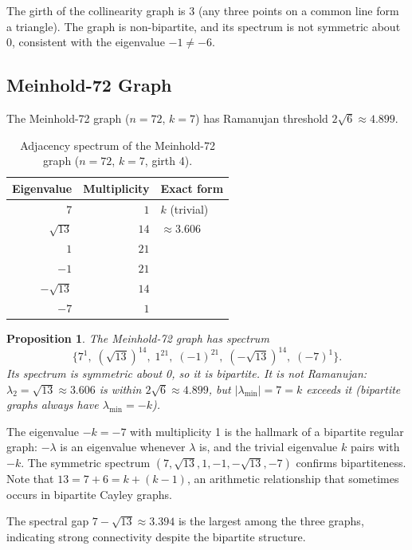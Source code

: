 \documentclass[11pt,a4paper]{article}
\theoremstyle{plain}
\newtheorem{proposition}[theorem]{Proposition}
\theoremstyle{definition}
\theoremstyle{remark}
\begin{document}
The girth of the collinearity graph is 3 (any three points on a common line form a triangle).
The graph is non-bipartite, and its spectrum is not symmetric about 0, consistent with
the eigenvalue $-1 \neq -6$.

\subsection{Meinhold-72 Graph}

The Meinhold-72 graph ($n = 72$, $k = 7$) has Ramanujan threshold $2\sqrt{6} \approx 4.899$.

\begin{table}[h]
\centering
\caption{Adjacency spectrum of the Meinhold-72 graph ($n=72$, $k=7$, girth 4).}
\label{tab:meinhold}
\begin{tabular}{@{}rrl@{}}
\toprule
Eigenvalue & Multiplicity & Exact form \\
\midrule
$7$           & $1$  & $k$ (trivial) \\
$\sqrt{13}$   & $14$ & $\approx 3.606$ \\
$1$           & $21$ & \\
$-1$          & $21$ & \\
$-\sqrt{13}$  & $14$ & \\
$-7$          & $1$  & \\
\bottomrule
\end{tabular}
\end{table}

\begin{proposition}
The Meinhold-72 graph has spectrum
\[
  \bigl\{7^1,\; (\sqrt{13})^{14},\; 1^{21},\; (-1)^{21},\;
  (-\sqrt{13})^{14},\; (-7)^1\bigr\}.
\]
Its spectrum is symmetric about 0, so it is bipartite.
It is \emph{not} Ramanujan: $\lambda_2 = \sqrt{13} \approx 3.606$ is within
$2\sqrt{6} \approx 4.899$, but $|\lambda_{\min}| = 7 = k$ exceeds it
(bipartite graphs always have $\lambda_{\min} = -k$).
\end{proposition}

The eigenvalue $-k = -7$ with multiplicity 1 is the hallmark of a bipartite regular graph:
$-\lambda$ is an eigenvalue whenever $\lambda$ is, and the trivial eigenvalue $k$ pairs with
$-k$.  The symmetric spectrum $(7, \sqrt{13}, 1, -1, -\sqrt{13}, -7)$ confirms bipartiteness.
Note that $13 = 7 + 6 = k + (k-1)$, an arithmetic relationship that sometimes occurs in
bipartite Cayley graphs.

The spectral gap $7 - \sqrt{13} \approx 3.394$ is the largest among the three graphs,
indicating strong connectivity despite the bipartite structure.
\end{document}
